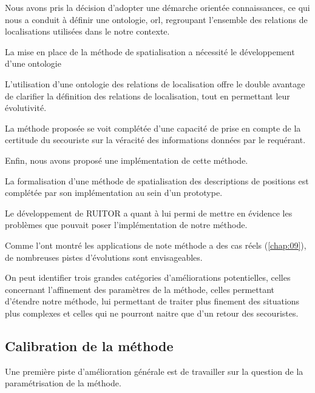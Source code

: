 Nous avons pris la décision d'adopter une démarche orientée
connaissances, ce qui nous a conduit à définir une ontologie,
\ac{orl}, regroupant l'ensemble des relations de localisations
utilisées dans le notre contexte.

La mise en place de la méthode de spatialisation a nécessité le
développement d'une ontologie

L'utilisation d'une ontologie des relations de localisation offre le
double avantage de clarifier la définition des relations de
localisation, tout en permettant leur évolutivité.



La méthode proposée se voit complétée d'une capacité de prise en
compte de la certitude du secouriste sur la véracité des informations
données par le requérant.


Enfin, nous avons proposé une implémentation de cette méthode.

La formalisation d'une méthode de spatialisation des descriptions de
positions est complétée par son implémentation au sein d'un prototype.




Le développement de RUITOR a quant à lui permi de mettre en évidence
les problèmes que pouvait poser l'implémentation de notre méthode.


Comme l'ont montré les applications de note méthode a des cas réels
(\autoref{chap:09}), de nombreuses pistes d'évolutions sont
envisageables.

On peut identifier trois grandes catégories d'améliorations
potentielles, celles concernant l'affinement des paramètres de la
méthode, celles permettant d'étendre notre méthode, lui permettant de
traiter plus finement des situations plus complexes et celles qui ne
pourront naitre que d'un retour des secouristes.

\subsection*{Calibration de la méthode}

Une première piste d'amélioration générale est de travailler sur la
question de la paramétrisation de la méthode. 


